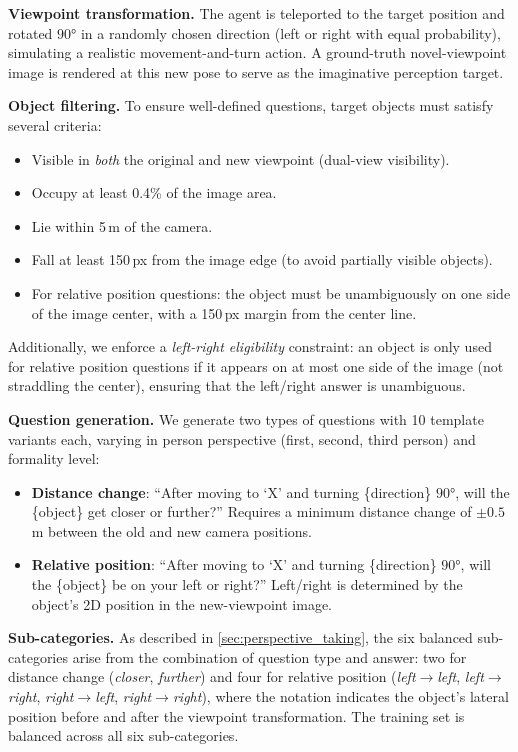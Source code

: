 \noindent\textbf{Viewpoint transformation.}
The agent is teleported to the target position and rotated $90°$ in a randomly chosen direction (left or right with equal probability), simulating a realistic movement-and-turn action.
A ground-truth novel-viewpoint image is rendered at this new pose to serve as the imaginative perception target.

\noindent\textbf{Object filtering.}
To ensure well-defined questions, target objects must satisfy several criteria:
\begin{itemize}
    \item Visible in \emph{both} the original and new viewpoint (dual-view visibility).
    \item Occupy at least 0.4\% of the image area.
    \item Lie within 5\,m of the camera.
    \item Fall at least 150\,px from the image edge (to avoid partially visible objects).
    \item For relative position questions: the object must be unambiguously on one side of the image center, with a 150\,px margin from the center line.
\end{itemize}
Additionally, we enforce a \emph{left-right eligibility} constraint: an object is only used for relative position questions if it appears on at most one side of the image (not straddling the center), ensuring that the left/right answer is unambiguous.

\noindent\textbf{Question generation.}
We generate two types of questions with 10 template variants each, varying in person perspective (first, second, third person) and formality level:
\begin{itemize}
    \item \textbf{Distance change}: ``After moving to `X' and turning \{direction\} $90°$, will the \{object\} get closer or further?'' Requires a minimum distance change of $\pm0.5$\,m between the old and new camera positions.
    \item \textbf{Relative position}: ``After moving to `X' and turning \{direction\} $90°$, will the \{object\} be on your left or right?'' Left/right is determined by the object's 2D position in the new-viewpoint image.
\end{itemize}

\noindent\textbf{Sub-categories.}
As described in \cref{sec:perspective_taking}, the six balanced sub-categories arise from the combination of question type and answer:
two for distance change (\emph{closer}, \emph{further}) and four for relative position (\emph{left$\to$left}, \emph{left$\to$right}, \emph{right$\to$left}, \emph{right$\to$right}), where the notation indicates the object's lateral position before and after the viewpoint transformation.
The training set is balanced across all six sub-categories.

